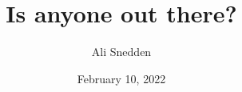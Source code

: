 \documentclass{beamer}
\title{Is anyone out there?}
\author{Ali Snedden
}
\date{February 10, 2022}
\begin{document}
\begin{frame}
\titlepage
\end{frame}





\end{document}

